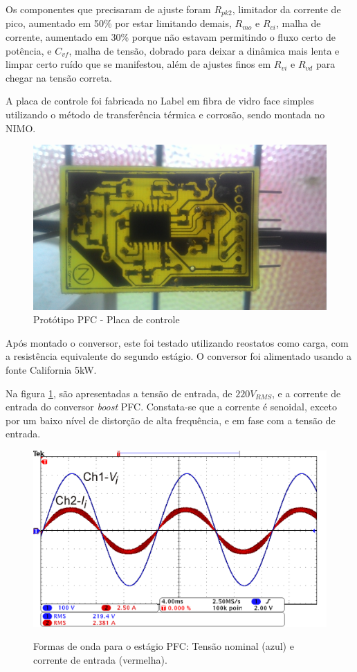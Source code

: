 \documentclass[
        12pt,
        openany, %
        oneside, %
        a4paper,			
        english,			
        brazil
        ]{abntbibufjf}
\begin{document}
Os componentes que precisaram de ajuste foram $R_{pk2}$, limitador da corrente de pico, aumentado em 50\% por estar limitando demais, $R_{mo}$ e $R_{ci}$, malha de corrente, aumentado em 30\% porque não estavam permitindo o fluxo certo de potência, e $C_{vf}$, malha de tensão, dobrado para deixar a dinâmica mais lenta e limpar certo ruído que se manifestou, além de ajustes finos em $R_{vi}$ e $R_{vd}$ para chegar na tensão correta.

A placa de controle foi fabricada no Label em fibra de vidro face simples utilizando o método de transferência térmica e corrosão, sendo montada no NIMO.

\begin{figure}[!h]
	\centering
	\caption{Protótipo PFC - Placa de controle}
	\includegraphics[scale=.05]{../FOTOGRAFIAS/P_20180910_103427.jpg}
\end{figure}

Após montado o conversor, este foi testado utilizando reostatos como carga, com a resistência equivalente do segundo estágio. O conversor foi alimentado usando a fonte California 5kW.


Na figura \ref{o_pfc_v_i_220}, são apresentadas a tensão de entrada, de $220V_{RMS}$, e a corrente de entrada do conversor \textit{boost} PFC. Constata-se que a corrente é senoidal, exceto por um baixo nível de distorção de alta frequência, e em fase com a tensão de entrada.

\begin{figure}[!h]
	\centering
	\caption{Formas de onda para o estágio PFC: Tensão nominal (azul) e corrente de entrada (vermelha).}
	\includegraphics[width=0.7\linewidth]{../FIGURAS/Figuras_TFC_Eric/Formas_de_onda/PFC_ACM}
	\label{o_pfc_v_i_220}
\end{figure}
\end{document}
